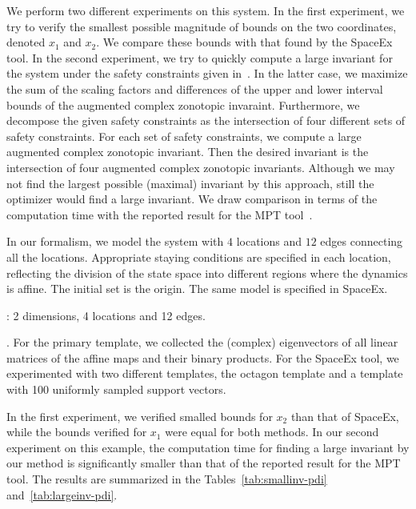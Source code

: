 We perform two different experiments on this system.  In the first
experiment, we try to verify the smallest possible magnitude of bounds
on the two coordinates, denoted $x_1$ and $x_2$. We compare these
bounds with that found by the SpaceEx tool.  In the second experiment,
we try to quickly compute a large invariant for the system under the
safety constraints given in~\cite{rakovic2004computation}.  %
In the latter case, we maximize the sum of the scaling factors and
differences of the upper and lower interval bounds of the augmented
complex zonotopic invaraint.  Furthermore, we decompose the given
safety constraints as the intersection of four different sets of
safety constraints.  For each set of safety constraints, we compute a
large augmented complex zonotopic invariant.  Then the desired
invariant is the intersection of four augmented complex zonotopic
invariants.  Although we may not find the largest possible (maximal)
invariant by this approach, still the optimizer would find a large
invariant.  We draw comparison in terms of the computation time with
the reported result for the MPT tool~\cite{rakovic2004computation}.

In our formalism, we model the system with $4$ locations and $12$
edges connecting all the locations.  Appropriate staying conditions
are specified in each location, reflecting the division of the state
space into different regions where the dynamics is affine. The initial
set is the origin. The same model is specified in SpaceEx.

: 2 dimensions, 4 locations and 12 edges.

.  For the primary template, we collected the
(complex) eigenvectors of all linear matrices of the affine maps and
their binary products. For the SpaceEx tool, we experimented with two
different templates, the octagon template and a template with 100
uniformly sampled support vectors.

  In the first experiment, we verified smalled bounds
for $x_2$ than that of SpaceEx, while the bounds verified for $x_1$
were equal for both methods.  In our second experiment on this
example, the computation time for finding a large invariant by our
method is significantly smaller than that of the reported result for
the MPT tool.  The results are summarized in the
Tables~\ref{tab:smallinv-pdi} and~\ref{tab:largeinv-pdi}.

